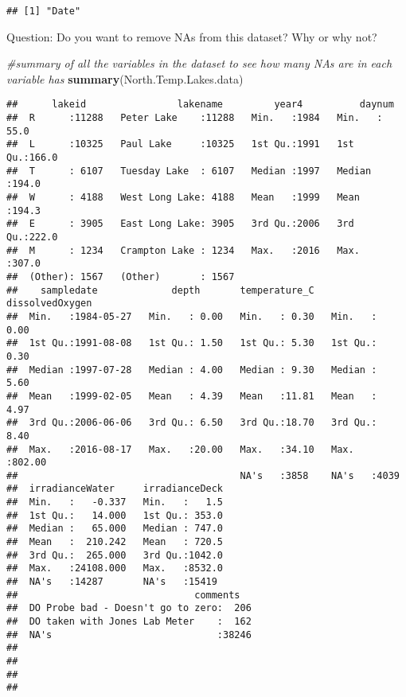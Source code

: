 \documentclass[]{article}
\newenvironment{Shaded}{\begin{snugshade}}{\end{snugshade}}
\newcommand{\KeywordTok}[1]{\textcolor[rgb]{0.13,0.29,0.53}{\textbf{#1}}}
\newcommand{\CommentTok}[1]{\textcolor[rgb]{0.56,0.35,0.01}{\textit{#1}}}
\newcommand{\NormalTok}[1]{#1}
\begin{document}
\begin{verbatim}
## [1] "Date"
\end{verbatim}

Question: Do you want to remove NAs from this dataset? Why or why not?

\begin{Shaded}
\begin{Highlighting}[]
\CommentTok{#summary of all the variables in the dataset to see how many NAs are in each variable has}
\KeywordTok{summary}\NormalTok{(North.Temp.Lakes.data)}
\end{Highlighting}
\end{Shaded}

\begin{verbatim}
##      lakeid                lakename         year4          daynum     
##  R      :11288   Peter Lake    :11288   Min.   :1984   Min.   : 55.0  
##  L      :10325   Paul Lake     :10325   1st Qu.:1991   1st Qu.:166.0  
##  T      : 6107   Tuesday Lake  : 6107   Median :1997   Median :194.0  
##  W      : 4188   West Long Lake: 4188   Mean   :1999   Mean   :194.3  
##  E      : 3905   East Long Lake: 3905   3rd Qu.:2006   3rd Qu.:222.0  
##  M      : 1234   Crampton Lake : 1234   Max.   :2016   Max.   :307.0  
##  (Other): 1567   (Other)       : 1567                                 
##    sampledate             depth       temperature_C   dissolvedOxygen 
##  Min.   :1984-05-27   Min.   : 0.00   Min.   : 0.30   Min.   :  0.00  
##  1st Qu.:1991-08-08   1st Qu.: 1.50   1st Qu.: 5.30   1st Qu.:  0.30  
##  Median :1997-07-28   Median : 4.00   Median : 9.30   Median :  5.60  
##  Mean   :1999-02-05   Mean   : 4.39   Mean   :11.81   Mean   :  4.97  
##  3rd Qu.:2006-06-06   3rd Qu.: 6.50   3rd Qu.:18.70   3rd Qu.:  8.40  
##  Max.   :2016-08-17   Max.   :20.00   Max.   :34.10   Max.   :802.00  
##                                       NA's   :3858    NA's   :4039    
##  irradianceWater     irradianceDeck  
##  Min.   :   -0.337   Min.   :   1.5  
##  1st Qu.:   14.000   1st Qu.: 353.0  
##  Median :   65.000   Median : 747.0  
##  Mean   :  210.242   Mean   : 720.5  
##  3rd Qu.:  265.000   3rd Qu.:1042.0  
##  Max.   :24108.000   Max.   :8532.0  
##  NA's   :14287       NA's   :15419   
##                               comments    
##  DO Probe bad - Doesn't go to zero:  206  
##  DO taken with Jones Lab Meter    :  162  
##  NA's                             :38246  
##                                           
##                                           
##                                           
## 
\end{verbatim}
\end{document}

